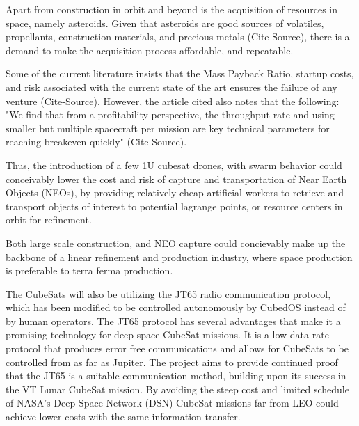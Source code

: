 Apart from construction in orbit and beyond is the acquisition of
resources in space, namely asteroids. Given that asteroids are good
sources of volatiles, propellants, construction materials, and
precious metals (Cite-Source), there is a demand to make the
acquisition process affordable, and repeatable.

Some of the current literature insists that the Mass Payback Ratio,
startup costs, and risk associated with the current state of the art
ensures the failure of any venture (Cite-Source). However, the article
cited also notes that the following: "We find that from a
profitability perspective, the throughput rate and using smaller but
multiple spacecraft per mission are key technical parameters for
reaching breakeven quickly" (Cite-Source).

Thus, the introduction of a few 1U cubesat drones, with swarm behavior
could conceivably lower the cost and risk of capture and
transportation of Near Earth Objects (NEOs), by providing relatively
cheap artificial workers to retrieve and transport objects of interest
to potential lagrange points, or resource centers in orbit for
refinement.

Both large scale construction, and NEO capture could concievably make
up the backbone of a linear refinement and production industry, where
space production is preferable to terra ferma production.

The CubeSats will also be utilizing the JT65 radio communication protocol, which has been modified to be controlled autonomously by CubedOS instead of by human operators. The JT65 protocol has several advantages that make it a promising technology for deep-space CubeSat missions. It is a low data rate protocol that produces error free communications and allows for CubeSats to be controlled from as far as Jupiter. The project aims to provide continued proof that the JT65 is a suitable communication method, building upon its success in the VT Lunar CubeSat mission. By avoiding the steep cost and limited schedule of NASA’s Deep Space Network (DSN) CubeSat missions far from LEO could achieve lower costs with the same information transfer.
